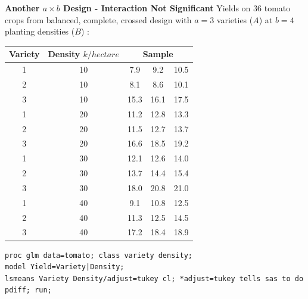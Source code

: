 \newpage
\textbf{Another $a \times b$ Design - Interaction Not Significant}
\bigkn 
Yields on $36$ tomato crops from balanced, complete, crossed design with $a=3$ varieties ($A$) at $b=4$ planting densities ($B$) :
\begin{center}
\begin{tabular}{|cc|ccc|}  \hline
Variety & Density $k/hectare$ & \multicolumn{3}{c|}{Sample} \\ \hline
1 & 10 & 7.9 & 9.2 & 10.5 \\
2 & 10 & 8.1 & 8.6 & 10.1 \\
3 & 10 & 15.3 & 16.1 & 17.5 \\
1 & 20 & 11.2 & 12.8 & 13.3 \\
2 & 20 & 11.5 & 12.7 & 13.7 \\
3 & 20 & 16.6 & 18.5 & 19.2 \\
1 & 30 & 12.1 & 12.6 & 14.0 \\
2 & 30 & 13.7 & 14.4 & 15.4 \\
3 & 30 & 18.0 & 20.8 & 21.0 \\
1 & 40 & 9.1 & 10.8 & 12.5 \\
2 & 40 & 11.3 & 12.5 & 14.5 \\
3 & 40 & 17.2 & 18.4 & 18.9 \\ \hline
\end{tabular}
\end{center}

\begin{small}
\begin{verbatim}
proc glm data=tomato; class variety density;
model Yield=Variety|Density;
lsmeans Variety Density/adjust=tukey cl; *adjust=tukey tells sas to do pdiff; run;
\end{verbatim}
\end{small}

